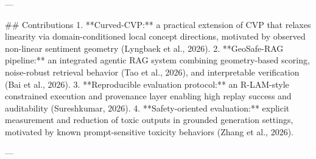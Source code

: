 ---

## Contributions
1. **Curved-CVP:** a practical extension of CVP that relaxes linearity via domain-conditioned local concept directions, motivated by observed non-linear sentiment geometry (Lyngbaek et al., 2026).  
2. **GeoSafe-RAG pipeline:** an integrated agentic RAG system combining geometry-based scoring, noise-robust retrieval behavior (Tao et al., 2026), and interpretable verification (Bai et al., 2026).  
3. **Reproducible evaluation protocol:** an R-LAM-style constrained execution and provenance layer enabling high replay success and auditability (Sureshkumar, 2026).  
4. **Safety-oriented evaluation:** explicit measurement and reduction of toxic outputs in grounded generation settings, motivated by known prompt-sensitive toxicity behaviors (Zhang et al., 2026).

---